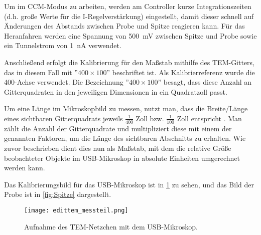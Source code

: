 Um im CCM-Modus zu arbeiten, werden am Controller kurze Integrationszeiten (d.h. große Werte für die I-Regelverstärkung) eingestellt, damit dieser schnell auf Änderungen des Abstands zwischen Probe und Spitze reagieren kann. Für das Heranfahren werden eine Spannung von \SI{500}{\mV} zwischen Spitze und Probe sowie ein Tunnelstrom von \SI{1}{\nA} verwendet.

Anschließend erfolgt die Kalibrierung für den Maßstab mithilfe des TEM-Gitters, das in diesem Fall mit ''$400 \times 100$'' beschriftet ist. Als Kalibrierreferenz wurde die 400-Achse verwendet. Die Bezeichnung ''$400 \times 100$'' besagt, dass diese Anzahl an Gitterquadraten in den jeweiligen Dimensionen in ein Quadratzoll passt.

Um eine Länge im Mikroskopbild zu messen, nutzt man, dass die Breite/Länge eines sichtbaren Gitterquadrats jeweils $\frac{1}{400}$ Zoll bzw. $\frac{1}{100}$ Zoll entspricht \cite{praktikum}. Man zählt die Anzahl der Gitterquadrate und multipliziert diese mit einem der genannten Faktoren, um die Länge des sichtbaren Abschnitts zu erhalten. Wie zuvor beschrieben dient dies nun als Maßstab, mit dem die relative Größe beobachteter Objekte im USB-Mikroskop in absolute Einheiten umgerechnet werden kann.

Das Kalibrierungsbild für das USB-Mikroskop ist in \cref{fig:Messteil} zu sehen, und das Bild der Probe ist in \cref{fig:Spitze} dargestellt.

\begin{figure}[htbp]
    \centering
    \texttt{[image: edittem\_messteil.png]}
    \caption{Aufnahme des TEM-Netzchen mit dem USB-Mikroskop.}
    \label{fig:Messteil}
\end{figure}


